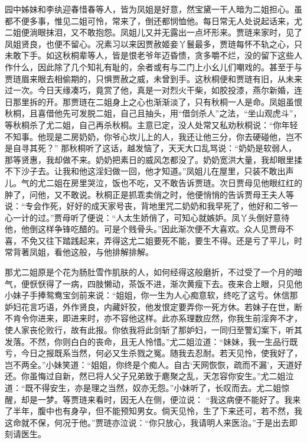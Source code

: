 \begin{parag}
    园中姊妹和李纨迎春惜春等人，皆为凤姐是好意，然宝黛一干人暗为二姐担心。虽都不便多事，惟见二姐可怜，常来了，倒还都悯恤他。每日常无人处说起话来，尤二姐便淌眼抹泪，又不敢抱怨。凤姐儿又并无露出一点坏形来。贾琏来家时，见了凤姐贤良，也便不留心。况素习以来因贾赦姬妾丫鬟最多，贾琏每怀不轨之心，只未敢下手。如这秋桐辈等人，皆是恨老爷年迈昏愦，贪多嚼不烂，没的留下这些人作什么，因此除了几个知礼有耻的，余者或有与二门上小幺儿们嘲戏的。甚至于与贾琏眉来眼去相偷期的，只惧贾赦之威，未曾到手。这秋桐便和贾琏有旧，从未来过一次。今日天缘凑巧，竟赏了他，真是一对烈火干柴，如胶投漆，燕尔新婚，连日那里拆的开。那贾琏在二姐身上之心也渐渐淡了，只有秋桐一人是命。凤姐虽恨秋桐，且喜借他先可发脱二姐，自己且抽头，用“借剑杀人”之法，“坐山观虎斗”，等秋桐杀了尤二姐，自己再杀秋桐。主意已定，没人处常又私劝秋桐说：“你年轻不知事。他现是二房奶奶，你爷心坎儿上的人，我还让他三分，你去硬碰他，岂不是自寻其死？” 那秋桐听了这话，越发恼了，天天大口乱骂说：“奶奶是软弱人，那等贤惠，我却做不来。奶奶把素日的威风怎都没了。奶奶宽洪大量，我却眼里揉不下沙子去。让我和他这淫妇做一回，他才知道。”凤姐儿在屋里，只装不敢出声儿。气的尤二姐在房里哭泣，饭也不吃，又不敢告诉贾琏。次日贾母见他眼红红的肿了，问他，又不敢说。秋桐正是抓乖卖俏之时，他便悄悄的告诉贾母王夫人等说：“专会作死，好好的成天家号丧，背地里咒二奶奶和我早死了，他好和二爷一心一计的过。”贾母听了便说：“人太生娇俏了，可知心就嫉妒。凤丫头倒好意待他，他倒这样争锋吃醋的。可是个贱骨头。”因此渐次便不大喜欢。众人见贾母不喜，不免又往下踏践起来，弄得这尤二姐要死不能，要生不得。还是亏了平儿，时常背著凤姐，看他这般，与他排解排解。
\end{parag}


\begin{parag}
    那尤二姐原是个花为肠肚雪作肌肤的人，如何经得这般磨折，不过受了一个月的暗气，便恹恹得了一病，四肢懒动，茶饭不进，渐次黄瘦下去。夜来合上眼，只见他小妹子手捧鸳鸯宝剑前来说：“姐姐，你一生为人心痴意软，终吃了这亏。休信那妒妇花言巧语，外作贤良，内藏奸狡，他发恨定要弄你一死方休。若妹子在世，断不肯令你进来，即进来时，亦不容他这样。此亦系理数应然，你我生前淫奔不才，使人家丧伦败行，故有此报。你依我将此剑斩了那妒妇，一同归至警幻案下，听其发落。不然，你则白白的丧命，且无人怜惜。”尤二姐泣道：“妹妹，我一生品行既亏，今日之报既系当然，何必又生杀戮之冤。随我去忍耐。若天见怜，使我好了，岂不两全。”小妹笑道：“姐姐，你终是个痴人。自古‘天网恢恢，疏而不漏’，天道好还。你虽悔过自新，然已将人父子兄弟致于麀聚之乱，天怎容你安生。”尤二姐泣道：“既不得安生，亦是理之当然，奴亦无怨。”小妹听了，长叹而去。尤二姐惊醒，却是一梦。等贾琏来看时，因无人在侧，便泣说： “我这病便不能好了。我来了半年，腹中也有身孕，但不能预知男女。倘天见怜，生了下来还可，若不然，我这命就不保，何况于他。”贾琏亦泣说：“你只放心，我请明人来医治。”于是出去即刻请医生。
\end{parag}



